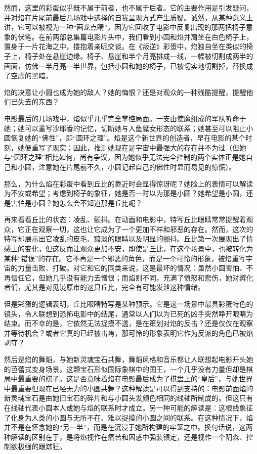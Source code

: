 然而，这里的彩蛋似乎既不属于前者，也不属于后者。它的主要作用是引发疑问，并对焰在片尾前最后几场戏中选择的自我呈现方式产生质疑。诚然，从某种意义上讲，它可以被视为一种“画龙点睛”，因为它回收了电影中反复出现的那两把椅子意象的伏笔。在前两部总集篇电影片头中，我们看到小圆和焰并肩坐在白色椅子上，置身于一片花海之中，搂抱着亲昵交谈。在《叛逆》彩蛋中，焰独自坐在类似的椅子上，椅子处在悬崖边缘。椅子、悬崖和半个月亮排成一线，一幅被切割成两半的画面，仿佛一半月亮一半世界，包括小圆和她的椅子，已被切实地切割掉，替换成了空虚的黑暗。

焰的决意让小圆也成为她的敌人？她的悔恨？还是对观众的一种残酷提醒，提醒他们已失去的东西？

电影最后的几场戏中，焰似乎几乎完全掌控局面。一支由使魔组成的军队听命于她；她可以重写沙耶香的记忆，切断她与人鱼魔女形态的联系；她甚至可以阻止小圆恢复她的“佛性”，即“圆环之理”。焰是这个新世界的创造者，早在电影的某个时刻，她便重写了现实；因此，推测她现在是宇宙中最强大的存在并不为过（但她与“圆环之理”相比如何，尚有争议，因为她似乎无法完全控制的两个实体正是她自己和小圆，注意她在片尾前不久，小圆记起自己的佛性时显而易见的惊慌）。

那么，为什么焰在彩蛋中看到丘比的靠近时会显得惊讶呢？她脸上的表情可以解读为不安或希望；考虑到椅子的象征，她是否一时以为那是小圆？她希望是小圆，还是害怕是小圆？她怎么会不知道那是丘比呢？

再来看看丘比的状态：凌乱、颤抖。在动画和电影中，特写丘比眼睛常常提醒着观众，它正在观察一切，这也让它成为了一个更加不祥和邪恶的存在。然而，这次的特写却展示出它凌乱的皮毛、黯淡的眼睛以及明显的颤抖。丘比第一次展现出了情感上的变化，但这反而让观众更加不安，即使是丘比，在这个场景中，也被转化为某种“错误”的存在。它不再是一个邪恶的角色，而是一个可怜的形象，被焰重写宇宙的力量击败、打破。对它和它的同类来说，这是最坏的情况：虽然小圆害怕、不再信任它，但她几乎没有能力去憎恨；而焰则不同，充满了愤怒和悲伤，她对孵化者们，尤其是对见泷原市的这只丘比，完全有可能发泄这种情绪。

但是彩蛋的逻辑表明，丘比眼睛特写是某种预示。它是这一场景中最具彩蛋特色的镜头，令人联想到恐怖电影中的结尾，通常以人们以为已死的凶手突然睁开眼睛为结束。而不幸的是，它依然无法捉摸不透，是在策划对焰的反击？还是仅仅在观察并等待机会？或者它真的已经被击垮，那可怜的形象表明它作为反派的角色已被焰剥夺？

然后是焰的舞蹈，与她新灵魂宝石共舞，舞蹈风格和音乐都让人联想起电影开头她的芭蕾式变身场景。这颗宝石形似国际象棋中的国王，一个几乎没有力量但却是棋局中最重要的棋子。这是否意味着焰在电影最后成为了棋盘上的“皇后”，与她世界中最重要但现在已经无力的小圆共舞？这种解读是可以得到支持的：电影前面焰的新灵魂宝石是由她旧宝石的碎片和与小圆头发颜色相同的线轴所制成的。但这只有在线轴代表小圆本人或她与焰的联系时才成立。另一种可能的解读是：这根线象征了化身为人类的小圆与无所不在、难以捉摸的小圆之间的联系。在这种情况下，焰并不是在怀念她的“另一半”，而是在沉浸于她所构建的牢笼之中。换句话说，这两种解读的区别在于，是将焰视作在痛苦和困惑中强装镇定，还是视作一个阴森、控制欲极强的跟踪狂。

